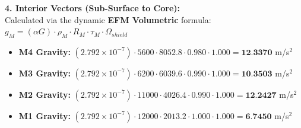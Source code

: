 \documentclass[11pt, a4paper]{article}
\begin{document}
  \vspace{0.5em}
  \noindent \textbf{4. Interior Vectors (Sub-Surface to Core):} \\[0.5em]
  \hspace*{1em} Calculated via the dynamic \textbf{EFM Volumetric} formula: $g_M = (\alpha G) \cdot \rho_{M} \cdot R_M \cdot \tau_M \cdot \Omega_{shield}$
  \begin{itemize}
    \item \textbf{M4 Gravity:} $(2.792 \times 10^{-7}) \cdot 5600 \cdot 8052.8 \cdot 0.980 \cdot 1.000 = \textbf{12.3370}$ m/s$^2$
    \item \textbf{M3 Gravity:} $(2.792 \times 10^{-7}) \cdot 6200 \cdot 6039.6 \cdot 0.990 \cdot 1.000 = \textbf{10.3503}$ m/s$^2$
    \item \textbf{M2 Gravity:} $(2.792 \times 10^{-7}) \cdot 11000 \cdot 4026.4 \cdot 0.990 \cdot 1.000 = \textbf{12.2427}$ m/s$^2$
    \item \textbf{M1 Gravity:} $(2.792 \times 10^{-7}) \cdot 12000 \cdot 2013.2 \cdot 1.000 \cdot 1.000 = \textbf{6.7450}$ m/s$^2$
  \end{itemize}
\end{document}
